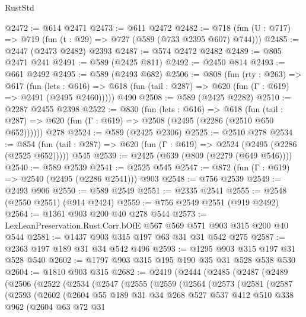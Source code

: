 \begin{lexlean}{RustStd}
\begin{coremodule}
{\begin{coremodule}
{{{{{{{{{@2472 := @614 @2471
@2473 := @611 @2472
@2482 := @718 (fun (U : @717) => @719 (fun (t : @29) => @727 (@589 (@733 @2395 @607) @744)))
@2485 := @2447 (@2473 @2482) @2393
@2487 := @574 @2472 @2482
@2489 := @805 @2471 @241
@2491 := @589 (@2425 @811)
@2492 := @2450 @814
@2493 := @661 @2492
@2495 := @589 (@2493 @682)
@2506 := @808
    (fun (rty : @263) =>
    @617
      (fun (lets : @616) =>
      @618 (fun (tail : @287) => @620 (fun (Γ : @619) => @2491 (@2495 @2460)))))
    @490
@2508 := @589 (@2425 @2282)
@2510 := @2287 @2455 @2398
@2522 := @830
    (fun (lets : @616) =>
    @618 (fun (tail : @287) => @620 (fun (Γ : @619) => @2508 (@2495 (@2286 (@2510 @650 @652))))))
    @278
@2524 := @589 (@2425 @2306)
@2525 := @2510 @278
@2534 := @854
    (fun (tail : @287) => @620 (fun (Γ : @619) => @2524 (@2495 (@2286 (@2525 @652)))))
    @545
@2539 := @2425 (@639 (@809 (@2279 (@649 @546))))
@2540 := @589 @2539
@2541 := @2525 @545
@2547 := @872 (fun (Γ : @619) => @2540 (@2495 (@2286 @2541))) @903
@2548 := @756 @2539
@2549 := @2493 @906
@2550 := @589 @2549
@2551 := @2335 @2541
@2555 := @2548 (@2550 @2551) (@914 @2424)
@2559 := @756 @2549 @2551 (@919 @2492)
@2564 := @1361 @903 @200 @40 @278 @544
@2573 := LexLeanPreservation.Rust.Corr.bOfE @567 @569 @571 @903 @315 @200 @40 @544
@2581 := @1437 @903 @315 @197 @63 @31 @31 @542 @275
@2587 := @2363 @197 @189 @31 @34 @542 @496
@2593 := @1295 @903 @315 @197 @31 @528 @540
@2602 := @1797 @903 @315 @195 @190 @35 @31 @528 @538 @530
@2604 := @1810 @903 @315
@2682 := @2419
    (@2444
      (@2485
        (@2487
          (@2489
            (@2506
              (@2522
                (@2534
                  (@2547
                    (@2555
                      (@2559
                        (@2564
                          (@2573
                            (@2581
                              (@2587
                                (@2593
                                  (@2602
                                    (@2604
                                      @55
                                      @189
                                      @31
                                      @34
                                      @268
                                      @527
                                      @537
                                      @412
                                      @510
                                      @338
                                      @962
                                      (@2604
                                        @63
                                        @72
                                        @31
}}}}}}}}}
\end{coremodule}}
\end{coremodule}
\end{lexlean}
